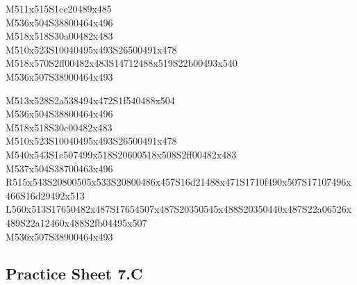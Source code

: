 \documentclass{article}
\begin{document}
\begin{multicols}{5}
\begin{center}
M511x515S1ce20489x485 %
\\M536x504S38800464x496 %
\\M518x518S30a00482x483 %
\\M510x523S10040495x493S26500491x478 %
\\M518x570S2ff00482x483S14712488x519S22b00493x540 %
\\M536x507S38900464x493 %
\vfil
\columnbreak

M513x528S2a538494x472S1f540488x504 %
\\M536x504S38800464x496 %
\\M518x518S30c00482x483 %
\\M510x523S10040495x493S26500491x478 %
\\M540x543S1c507499x518S20600518x508S2ff00482x483 %
\\M537x504S38700463x496 %
\\R515x543S20800505x533S20800486x457S16d21488x471S1710f490x507S17107496x466S16d29492x513 %
\\L560x513S17650482x487S17654507x487S20350545x488S20350440x487S22a06526x489S22a12460x488S2fb04495x507 %
\\M536x507S38900464x493 %
\vfil

\end{center}
\end{multicols}

\subsection{Practice Sheet 7.C}
\end{document}
